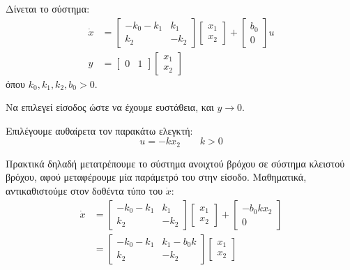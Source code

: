 \documentclass[11pt,a4paper,notitlepage,fleqn]{article}
\begin{document}
\begin{exercise}[Παράδειγμα]
	Δίνεται το σύστημα:
	\begin{align*}
	\dot x &= \left[
	\begin{matrix}
	-k_0-k_1 & k_1 \\
	k_2 & -k_2
	\end{matrix}
	\right]\left[\begin{matrix}
	x_1 \\ x_2
	\end{matrix}\right] + \left[
	\begin{matrix}
	b_0 \\ 0
	\end{matrix}
	\right]u \\
	y &= \left[
	\begin{matrix}
	0 & 1
	\end{matrix}
	\right]\left[\begin{matrix}
	x_1 \\ x_2
	\end{matrix}\right]
	\end{align*}
	όπου \( k_0,k_1,k_2,b_0 > 0 \).
	
	Να επιλεγεί είσοδος ώστε να έχουμε ευστάθεια, και \( y \to 0 \).
	
	\tcblower
	
	Επιλέγουμε αυθαίρετα τον παρακάτω ελεγκτή:
	\[
	u = -kx_2\qquad k>0
	\]
	
	Πρακτικά δηλαδή μετατρέπουμε το σύστημα ανοιχτού βρόχου σε σύστημα κλειστού
	βρόχου, αφού μεταφέρουμε μία παράμετρό του στην είσοδο. Μαθηματικά,
	αντικαθιστούμε στον δοθέντα τύπο του \( \dot x \):
	\begin{align*}
		\dot x &= \left[\begin{matrix}
		-k_0-k_1 & k_1 \\ k_2 & -k_2
		\end{matrix}\right]\left[\begin{matrix}
		x_1 \\ x_2
		\end{matrix}\right] + \left[\begin{matrix}
		-b_0kx_2 \\ 0
		\end{matrix}\right]
		\\ &=
		\left[\begin{matrix}
		-k_0 - k_1 & k_1-b_0k \\
		k_2 & -k_2
		\end{matrix}\right]\left[\begin{matrix}
		x_1 \\ x_2
		\end{matrix}\right]
	\end{align*}
	

\end{exercise}
\end{document}
